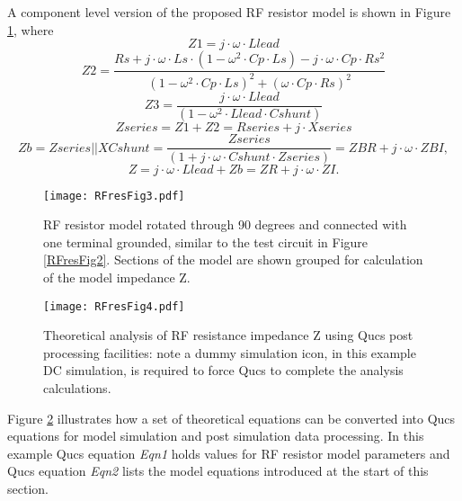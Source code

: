 \newpage
{}
A component level version of the proposed RF resistor model is shown in Figure \ref{RFresFig3}, where
\begin{equation}
 Z1 = j \cdot \omega \cdot Llead
\end{equation}
\begin{equation}
 Z2 =\dfrac{Rs+j \cdot \omega \cdot Ls \cdot(1-\omega^{2} \cdot Cp \cdot Ls) -j \cdot \omega \cdot Cp \cdot Rs^{2}}{(1-\omega^{2} \cdot Cp \cdot Ls )^{2} + (\omega \cdot Cp \cdot Rs)^{2}}
\end{equation}
\begin{equation}
 Z3 = \dfrac{j \cdot \omega \cdot Llead}{(1-\omega^{2} \cdot Llead \cdot Cshunt )}
\end{equation}
\begin{equation}
Zseries = Z1 + Z2 = Rseries + j \cdot Xseries
\end{equation}
\begin{equation}
Zb = Zseries || XCshunt = \dfrac{Zseries}{(1 + j \cdot \omega \cdot Cshunt \cdot Zseries)} = ZBR + j \cdot \omega \cdot ZBI,
\end{equation}
\begin{equation}
Z = j \cdot \omega \cdot Llead + Zb = ZR + j \cdot \omega \cdot ZI.
\end{equation}
\begin{figure}[h]
\begin{center}
	\texttt{[image: RFresFig3.pdf]}
	\caption{RF resistor model rotated through 90 degrees and connected with one terminal grounded, similar to the test circuit in Figure \ref{RFresFig2}. Sections of the model are shown grouped for calculation of the model impedance Z.}
	\label{RFresFig3}
\end{center}
\end{figure}
\begin{figure}[h]
\begin{center}
	\texttt{[image: RFresFig4.pdf]}
	\caption{Theoretical analysis of RF resistance impedance Z using Qucs post processing facilities: note a dummy simulation icon, in this example DC simulation, is required to force Qucs to complete the analysis calculations.}
	\label{RFresFig4}
\end{center}
\end{figure}
Figure \ref{RFresFig4} illustrates how a set of theoretical equations can be converted into Qucs equations for model simulation and post simulation data processing.
In this example Qucs equation \textit{Eqn1} holds values for RF resistor model parameters and Qucs equation \textit{Eqn2} lists the model equations introduced at the start of this section.
